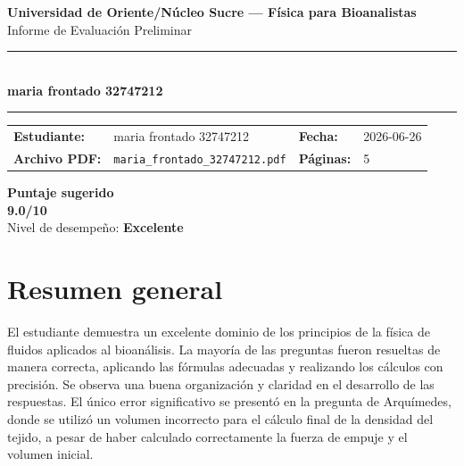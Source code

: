 \documentclass[11pt,a4paper]{article}
\begin{document}
\begin{center}
  {\Large\bfseries\color{azulTitulo} Universidad de Oriente/Núcleo Sucre --- Física para Bioanalistas}\\[4pt]
  {\large Informe de Evaluación Preliminar}\\[12pt]
  \rule{\linewidth}{1.2pt}\\[6pt]
  {\LARGE\bfseries maria frontado 32747212}\\[4pt]
  \rule{\linewidth}{0.6pt}
\end{center}

\vspace{4pt}
\begin{tcolorbox}[cajaTitulo, title=Datos del informe]
\begin{tabular}{@{}llll@{}}
  \textbf{Estudiante:}  & maria frontado 32747212  &
  \textbf{Fecha:}       & 2026-06-26 \\[4pt]
  \textbf{Archivo PDF:} & \texttt{maria\_frontado\_32747212.pdf}  &
  \textbf{Páginas:}     & 5 \\
\end{tabular}
\end{tcolorbox}

\vspace{6pt}
\begin{center}
  \begin{tcolorbox}[
    enhanced,
    colback=white, colframe=desempeno_excelente,
    width=0.62\linewidth,
    boxrule=2pt,
    halign=center, valign=center,
    top=8pt, bottom=8pt,
  ]
    \centering
    {\large\bfseries Puntaje sugerido}\\[6pt]
    {\Huge\bfseries\color{desempeno_excelente} 9.0/10}\\[6pt]
    {\large Nivel de desempeño: \textbf{\color{desempeno_excelente} Excelente}}
  \end{tcolorbox}
\end{center}

\section*{Resumen general}
El estudiante demuestra un excelente dominio de los principios de la física de fluidos aplicados al bioanálisis. La mayoría de las preguntas fueron resueltas de manera correcta, aplicando las fórmulas adecuadas y realizando los cálculos con precisión. Se observa una buena organización y claridad en el desarrollo de las respuestas. El único error significativo se presentó en la pregunta de Arquímedes, donde se utilizó un volumen incorrecto para el cálculo final de la densidad del tejido, a pesar de haber calculado correctamente la fuerza de empuje y el volumen inicial.
\end{document}
